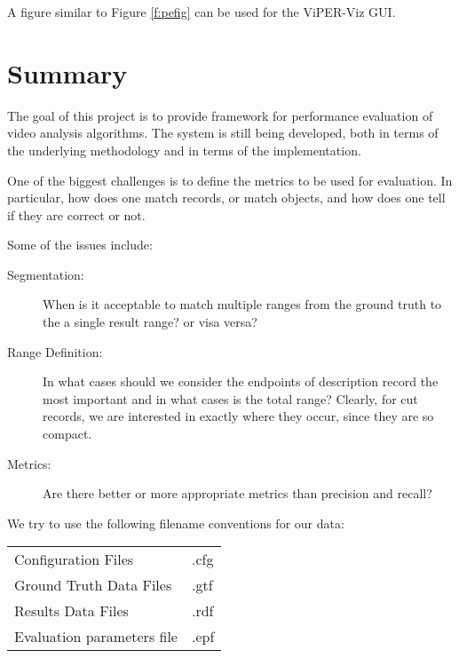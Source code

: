 A figure similar to Figure \ref{f:pefig} can be used for the ViPER-Viz GUI.



\section{Summary}

The goal of this project is to provide framework for performance evaluation of 
video analysis algorithms.  The system is still being developed, both in
terms of the underlying methodology and in terms of the implementation.

One of the biggest challenges is to define the metrics to be used for
evaluation.  In particular, how does one match records, or match
objects, and how does one tell if they are correct or not.

\noindent Some of the issues include:
\begin{description}
\item [Segmentation:]  When is it acceptable to match multiple ranges 
from the ground truth to the a single result range? or visa versa?  

\item [Range Definition:] In what cases should we consider the endpoints of
description record the most important and in what cases is the total range?  Clearly, for cut records, we are interested in exactly where they occur, since they are so compact.

\item [Metrics:] Are there better or more appropriate metrics than precision
and recall?
\end{description}




We try to use the following filename conventions for our data:

\begin{tabular}{ll}     
Configuration Files& .cfg\\
Ground Truth Data Files& .gtf \\
Results Data Files & .rdf\\
Evaluation parameters file & .epf
\end{tabular}

